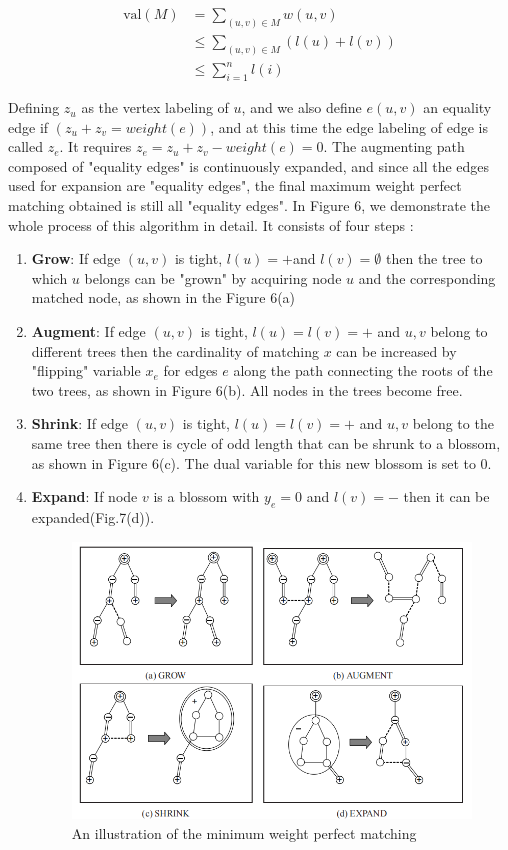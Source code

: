 \documentclass[
    a4paper, %
    10pt, %
    unnumberedsections, %
    twoside, %
]{LTJournalArticle}
\begin{document}
\begin{center}
\begin{align*}
    \text{val}(M) &= \sum_{(u,v)\in M}w(u,v) \\
    &\leq \sum_{(u,v)\in M}(l(u)+l(v)) \\
    &\leq \sum_{i=1}^{n}l(i)
\end{align*}
\end{center}
Defining $z_u$ as the vertex labeling of $u$, and we also define $e(u,v)$ an equality edge if $(z_u+z_v=weight(e))$, and at this time the edge labeling of edge is called $z_e$. It requires $z_e=z_u+z_v-weight(e)=0$.
The augmenting path composed of "equality edges" is continuously expanded, and since all the edges used for expansion are "equality edges", the final maximum weight perfect matching obtained is still all "equality edges".
In Figure 6, we demonstrate the whole process of this algorithm in detail. It consists of four steps \cite{10}:
\begin{enumerate}
    \item \textbf{Grow}: If edge $(u,v)$ is tight, $l(u) = + $and $l(v) = \emptyset$ then the tree to which $u$ belongs can be "grown" by acquiring node $u$ and the corresponding matched node, as shown in the Figure 6(a)
    \item \textbf{Augment}: If edge $(u,v) $ is tight, $l(u) = l(v) = + $ and $u,v$ belong to different trees then the cardinality of matching $x$ can be increased by "flipping" variable $x_e$ for edges $e$ along the path connecting the roots of the two trees, as shown in Figure 6(b). All nodes in the trees become free.
    \item \textbf{Shrink}: If edge $(u,v) $ is tight, $l(u) = l(v) = + $ and $u,v$ belong to the same tree then there is cycle of odd length that can be shrunk to a blossom, as shown in Figure 6(c). The dual variable for this new blossom is set to 0.
    \item \textbf{Expand}: If node $v$ is a blossom with $y_e = 0$ and $l(v) = -$ then it can be expanded(Fig.7(d)).
\begin{figure} %
    \setlength{\abovecaptionskip}{0.cm} %
    \setlength{\abovecaptionskip}{0.cm} 
    \includegraphics[width=\linewidth]{img/minimum weight.png}
    \caption{An illustration of the minimum weight perfect matching}
\end{figure}
\end{enumerate}
\end{document}
